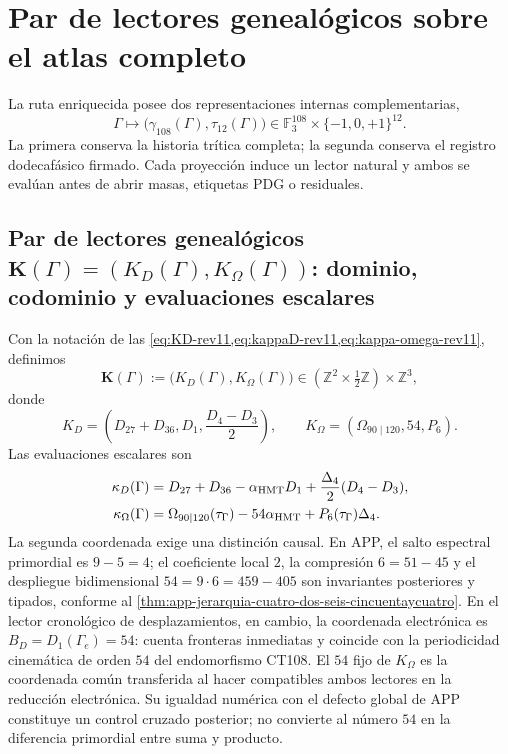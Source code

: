 \section{Par de lectores genealógicos sobre el atlas completo}
\label{sec:operadores-masa-two-way-rev11}

La ruta enriquecida posee dos representaciones internas complementarias,
\[
 \Gamma\longmapsto
 \bigl(\gamma_{108}(\Gamma),\tau_{12}(\Gamma)\bigr)
 \in\mathbb F_3^{108}\times\{-1,0,+1\}^{12}.
\]
La primera conserva la historia trítica completa; la segunda conserva el
registro dodecafásico firmado. Cada proyección induce un lector natural y ambos
se evalúan antes de abrir masas, etiquetas PDG o residuales.

\subsection{Par de lectores genealógicos \(\mathbf K(\Gamma)=(K_D(\Gamma),K_\Omega(\Gamma))\): dominio, codominio y evaluaciones escalares}

Con la notación de las
\cref{eq:KD-rev11,eq:kappaD-rev11,eq:kappa-omega-rev11}, definimos
\begin{equation}
 \mathbf K(\Gamma)
 :=\bigl(K_D(\Gamma),K_\Omega(\Gamma)\bigr)
 \in\left(\mathbb Z^2\times\tfrac12\mathbb Z\right)
 \times\mathbb Z^3,
 \label{eq:lector-conjunto-masas-rev11}
\end{equation}
donde
\[
 K_D=\left(D_{27}+D_{36},D_1,\frac{D_4-D_3}{2}\right),
 \qquad
 K_\Omega=(\Omega_{90\mid120},54,P_6).
\]
Las evaluaciones escalares son
\begin{align}
 \kappa_D(\Gamma)
 &=D_{27}+D_{36}-\alpha_{\rm HMT}D_1
 +\frac{\Delta_4}{2}(D_4-D_3),
 \label{eq:kappaD-general-rev11}\\
\kappa_\Omega(\Gamma)
&=\Omega_{90\mid120}(\tau_\Gamma)
-54\alpha_{\rm HMT}+P_6(\tau_\Gamma)\Delta_4.
\label{eq:kappaOmega-general-rev11}
\end{align}
La segunda coordenada exige una distinción causal. En APP, el salto
espectral primordial es \(9-5=4\); el coeficiente local \(2\), la compresión
\(6=51-45\) y el despliegue bidimensional \(54=9\cdot6=459-405\) son
invariantes posteriores y tipados, conforme al
\cref{thm:app-jerarquia-cuatro-dos-seis-cincuentaycuatro}. En el lector
cronológico de desplazamientos, en cambio, la coordenada electrónica es
\(B_D=D_1(\Gamma_e)=54\): cuenta fronteras inmediatas y coincide con la
periodicidad cinemática de orden \(54\) del endomorfismo CT108. El
\(54\) fijo de
\(K_\Omega\) es la coordenada común transferida al hacer compatibles ambos
lectores en la reducción electrónica. Su igualdad numérica con el defecto
global de APP constituye un control cruzado posterior; no convierte al
número \(54\) en la diferencia primordial entre suma y producto.

